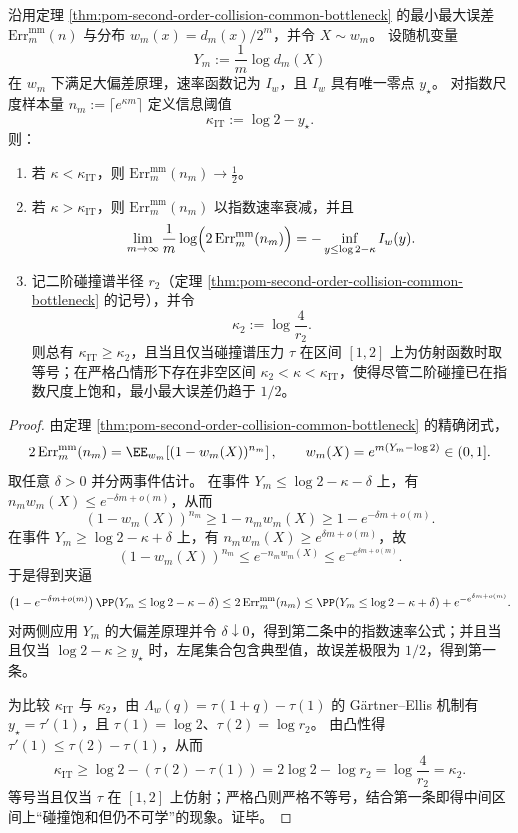 \begin{theorem}[指数样本尺度下最小最大误差的多重分形尾质量律与阈值严格分离]\label{thm:conclusion-minimax-error-multifractal-tail-law}
沿用定理 \ref{thm:pom-second-order-collision-common-bottleneck} 的最小最大误差 \(\mathrm{Err}_m^{\mathrm{mm}}(n)\) 与分布 \(w_m(x)=d_m(x)/2^m\)，并令 \(X\sim w_m\)。
设随机变量
\[
Y_m:=\frac1m\log d_m(X)
\]
在 \(w_m\) 下满足大偏差原理，速率函数记为 \(I_w\)，且 \(I_w\) 具有唯一零点 \(y_\star\)。
对指数尺度样本量 \(n_m:=\lceil e^{\kappa m}\rceil\) 定义信息阈值
\[
\kappa_{\mathrm{IT}}:=\log 2-y_\star.
\]
则：
\begin{enumerate}
  \item 若 \(\kappa<\kappa_{\mathrm{IT}}\)，则 \(\mathrm{Err}_m^{\mathrm{mm}}(n_m)\to \tfrac12\)。
  \item 若 \(\kappa>\kappa_{\mathrm{IT}}\)，则 \(\mathrm{Err}_m^{\mathrm{mm}}(n_m)\) 以指数速率衰减，并且
  \[
  \lim_{m\to\infty}\frac1m\log\Bigl(2\,\mathrm{Err}_m^{\mathrm{mm}}(n_m)\Bigr)
  =
  -\inf_{y\le \log 2-\kappa} I_w(y).
  \]
  \item 记二阶碰撞谱半径 \(r_2\)（定理 \ref{thm:pom-second-order-collision-common-bottleneck} 的记号），并令
  \[
  \kappa_2:=\log\frac{4}{r_2}.
  \]
  则总有 \(\kappa_{\mathrm{IT}}\ge \kappa_2\)，且当且仅当碰撞谱压力 \(\tau\) 在区间 \([1,2]\) 上为仿射函数时取等号；在严格凸情形下存在非空区间 \(\kappa_2<\kappa<\kappa_{\mathrm{IT}}\)，使得尽管二阶碰撞已在指数尺度上饱和，最小最大误差仍趋于 \(1/2\)。
\end{enumerate}
\end{theorem}
\begin{proof}
由定理 \ref{thm:pom-second-order-collision-common-bottleneck} 的精确闭式，
\[
2\,\mathrm{Err}_m^{\mathrm{mm}}(n_m)=\EE_{w_m}\!\left[(1-w_m(X))^{n_m}\right],
\qquad
w_m(X)=e^{m(Y_m-\log 2)}\in(0,1].
\]
取任意 \(\delta>0\) 并分两事件估计。
在事件 \(Y_m\le \log 2-\kappa-\delta\) 上，有 \(n_m w_m(X)\le e^{-\delta m+o(m)}\)，从而
\[
(1-w_m(X))^{n_m}\ge 1-n_m w_m(X)\ge 1-e^{-\delta m+o(m)}.
\]
在事件 \(Y_m\ge \log 2-\kappa+\delta\) 上，有 \(n_m w_m(X)\ge e^{\delta m+o(m)}\)，故
\[
(1-w_m(X))^{n_m}\le e^{-n_m w_m(X)}\le e^{-e^{\delta m+o(m)}}.
\]
于是得到夹逼
\[
\bigl(1-e^{-\delta m+o(m)}\bigr)\,\PP\!\left(Y_m\le \log 2-\kappa-\delta\right)
\le
2\,\mathrm{Err}_m^{\mathrm{mm}}(n_m)
\le
\PP\!\left(Y_m\le \log 2-\kappa+\delta\right)+e^{-e^{\delta m+o(m)}}.
\]
对两侧应用 \(Y_m\) 的大偏差原理并令 \(\delta\downarrow 0\)，得到第二条中的指数速率公式；并且当且仅当 \(\log 2-\kappa\ge y_\star\) 时，左尾集合包含典型值，故误差极限为 \(1/2\)，得到第一条。
\par
为比较 \(\kappa_{\mathrm{IT}}\) 与 \(\kappa_2\)，由 \(\Lambda_w(q)=\tau(1+q)-\tau(1)\) 的 G\"artner--Ellis 机制有 \(y_\star=\tau'(1)\)，且 \(\tau(1)=\log 2\)、\(\tau(2)=\log r_2\)。
由凸性得 \(\tau'(1)\le \tau(2)-\tau(1)\)，从而
\[
\kappa_{\mathrm{IT}}
\ge
\log 2-(\tau(2)-\tau(1))
=
2\log 2-\log r_2
=
\log\frac{4}{r_2}
=\kappa_2.
\]
等号当且仅当 \(\tau\) 在 \([1,2]\) 上仿射；严格凸则严格不等号，结合第一条即得中间区间上“碰撞饱和但仍不可学”的现象。证毕。
\end{proof}

